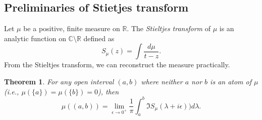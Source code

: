 \documentclass[11pt, a4paper]{article}
\numberwithin{equation}{section}
\newcommand{\compC}{\mathbb{C}}
\newcommand{\realR}{\mathbb{R}}
\newcommand{\ie}{i.e.}
\newtheorem{thm}{Theorem}
\theoremstyle{definition}
\theoremstyle{remark}
\begin{document}
\subsection{Preliminaries of Stietjes transform}

Let $\mu$ be a positive, finite measure on $\realR$. The \emph{Stieltjes transform} of $\mu$ is an analytic function on $\compC \setminus \realR$ defined as
\begin{equation}
  S_{\mu}(z) = \int \frac{d\mu}{t - z}.
\end{equation}
From the Stieltjes transform, we can reconstruct the measure practically.
\begin{thm} \label{thm:Stieltjes_reconstruction}
  For any open interval $(a, b)$ where neither $a$ nor $b$ is an atom of $\mu$ (\ie, $\mu(\{ a \}) = \mu(\{ b \}) = 0$), then
  \begin{equation}
    \mu((a, b)) = \lim_{\epsilon \to 0^+} \frac{1}{\pi} \int^b_a \Im S_{\mu}(\lambda + i\epsilon)) d\lambda.
  \end{equation}
\end{thm}
\end{document}
